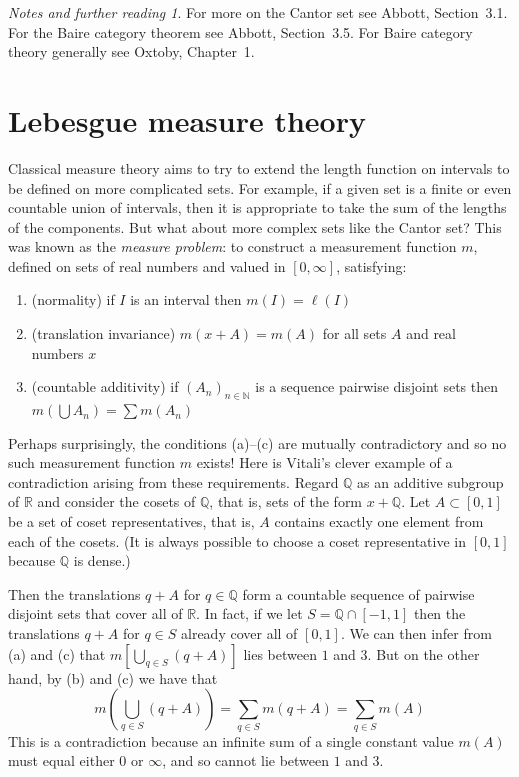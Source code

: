 \documentclass[11pt,oneside,a4paper]{amsbook}
\newcommand{\N}{\mathbb N}
\newcommand{\Q}{\mathbb Q}
\newcommand{\R}{\mathbb R}
\theoremstyle{definition}
\theoremstyle{plain}
\theoremstyle{definition}
\theoremstyle{remark}
\newtheorem*{notes}{Notes and further reading}
\numberwithin{equation}{section}
\numberwithin{figure}{section}
\begin{document}
\begin{notes}
  For more on the Cantor set see Abbott, Section~3.1. For the Baire category theorem see Abbott, Section~3.5. For Baire category theory generally see Oxtoby, Chapter~1.
\end{notes}


\newpage
\section{Lebesgue measure theory}

Classical measure theory aims to try to extend the length function on intervals to be defined on more complicated sets. For example, if a given set is a finite or even countable union of intervals, then it is appropriate to take the sum of the lengths of the components. But what about more complex sets like the Cantor set? This was known as the \emph{measure problem}: to construct a measurement function $m$, defined on sets of real numbers and valued in $[0,\infty]$, satisfying:

\begin{enumerate}
  \item (normality) if $I$ is an interval then $m(I)=\ell(I)$
  \item (translation invariance) $m(x+A)=m(A)$ for all sets $A$ and real numbers $x$
  \item (countable additivity) if $(A_n)_{n\in\N}$ is a sequence pairwise disjoint sets then $m(\bigcup A_n)=\sum m(A_n)$
\end{enumerate}

Perhaps surprisingly, the conditions (a)--(c) are mutually contradictory and so no such measurement function $m$ exists! Here is Vitali's clever example of a contradiction arising from these requirements. Regard $\Q$ as an additive subgroup of $\R$ and consider the cosets of $\Q$, that is, sets of the form $x+\Q$. Let $A\subset[0,1]$ be a set of coset representatives, that is, $A$ contains exactly one element from each of the cosets. (It is always possible to choose a coset representative in $[0,1]$ because $\Q$ is dense.)

Then the translations $q+A$ for $q\in\Q$ form a countable sequence of pairwise disjoint sets that cover all of $\R$. In fact, if we let $S=\Q\cap[-1,1]$ then the translations $q+A$ for $q\in S$ already cover all of $[0,1]$. We can then infer from (a) and (c) that $m[\bigcup_{q\in S}(q+A)]$ lies between $1$ and $3$. But on the other hand, by (b) and (c) we have that
\[m\left(\bigcup_{q\in S}(q+A)\right)=\sum_{q\in S}m(q+A)=\sum_{q\in S}m(A)
\]
This is a contradiction because an infinite sum of a single constant value $m(A)$ must equal either $0$ or $\infty$, and so cannot lie between $1$ and $3$.
\end{document}
